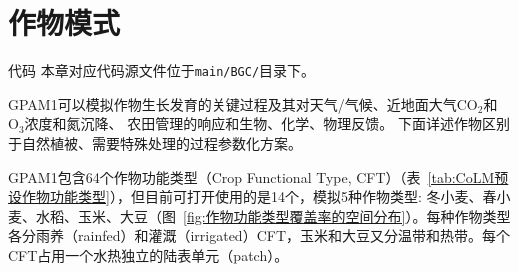 \chapter{作物模式}
\begin{mymdframed}{代码}
  本章对应代码源文件位于\texttt{main/BGC/}目录下。
\end{mymdframed}

GPAM1可以模拟作物生长发育的关键过程及其对天气/气候、近地面大气$\mathrm{CO_2}$和$\mathrm{O_3}$浓度和氮沉降、
农田管理的响应和生物、化学、物理反馈。
下面详述作物区别于自然植被、需要特殊处理的过程参数化方案。

GPAM1包含64个作物功能类型（Crop Functional Type, CFT）（表~\ref{tab:CoLM预设作物功能类型}），但目前可打开使用的是14个，模拟5种作物类型: 冬小麦、春小麦、水稻、玉米、大豆（图~\ref{fig:作物功能类型覆盖率的空间分布}）。每种作物类型各分雨养（rainfed）和灌溉（irrigated）CFT，玉米和大豆又分温带和热带。每个CFT占用一个水热独立的陆表单元（patch）。
